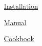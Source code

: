 
\begin{DoxyItemize}
\item \mbox{\hyperlink{installpage}{Installation}}
\item \mbox{\hyperlink{manualpage}{Manual}}
\item \mbox{\hyperlink{cookbookpage}{Cookbook}} 
\end{DoxyItemize}